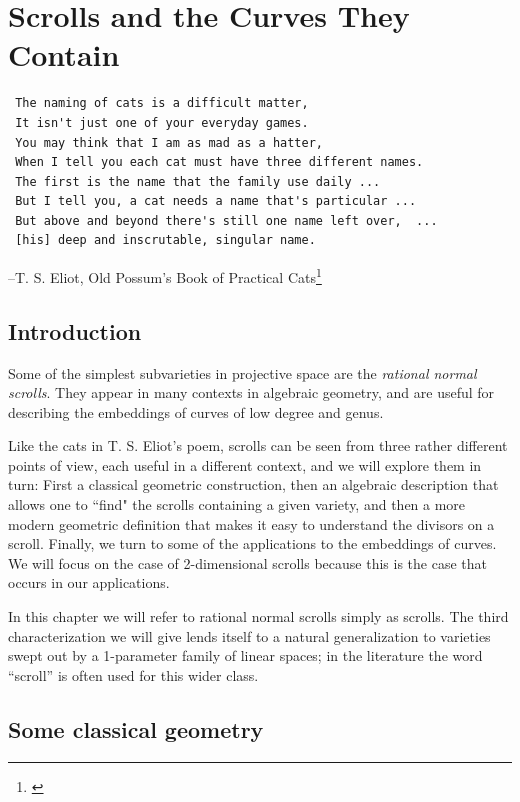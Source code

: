 


\chapter{Scrolls and the Curves They Contain}
\label{ScrollsChapter}


\begin{verbatim}
 The naming of cats is a difficult matter,
 It isn't just one of your everyday games.
 You may think that I am as mad as a hatter,
 When I tell you each cat must have three different names.
 The first is the name that the family use daily ...
 But I tell you, a cat needs a name that's particular ...
 But above and beyond there's still one name left over,  ...
 [his] deep and inscrutable, singular name.
\end{verbatim}
--T. S. Eliot, Old Possum's Book of Practical Cats\footnote{\cite{PracticalCats}}
%

\section*{Introduction}
Some of the simplest subvarieties in projective space are the \emph{rational normal scrolls}. They appear in many contexts in algebraic geometry, and are useful for describing the embeddings of curves of low degree and genus. 

Like the cats in T. S. Eliot's poem, scrolls can be seen from three rather different points of view, each useful in a different context, and we will explore them in turn: First a classical geometric construction, then an algebraic description that allows one to ``find" the scrolls containing a given variety, and then a more modern geometric definition that makes it easy to understand the divisors on a scroll. Finally, we turn to some of the applications to the embeddings of curves. We will focus on the case of 2-dimensional scrolls because this is the case that occurs in our applications.

In this chapter we will refer to rational normal scrolls simply as scrolls. The third characterization we will give lends itself to a natural generalization to  varieties swept out by a 1-parameter family of linear spaces; in the literature the word ``scroll'' is often used for this wider class.

\section{Some classical geometry}\label{daily name}

